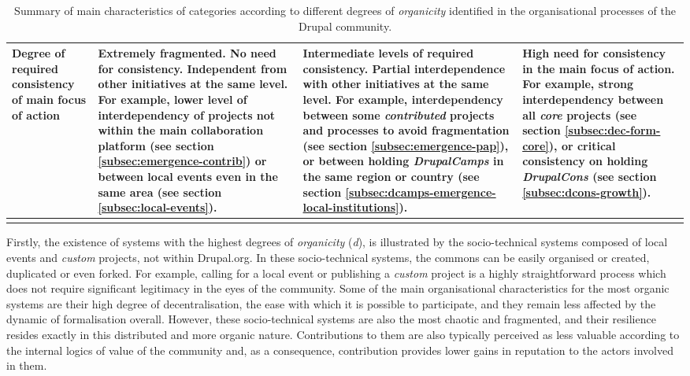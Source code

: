 \begin{footnotesize}
\begin{longtable}{|p{3cm}||p{3.4cm}|p{3.4cm}|p{3.4cm}|}
Degree of required consistency of main focus of action &
Extremely fragmented. No need for consistency. Independent from other initiatives at the same level. For example, lower level of interdependency of projects not within the main collaboration platform (see section \ref{subsec:emergence-contrib}) or between local events even in the same area (see section \ref{subsec:local-events}). &
Intermediate levels of required consistency. Partial interdependence with other initiatives at the same level. For example, interdependency between some \textit{contributed} projects and processes to avoid fragmentation (see section \ref{subsec:emergence-pap}), or between holding \textit{DrupalCamps} in the same region or country (see section \ref{subsec:dcamps-emergence-local-institutions}). &
High need for consistency in the main focus of action. For example, strong interdependency between all \textit{core} projects (see section \ref{subsec:dec-form-core}), or critical consistency on holding \textit{DrupalCons} (see section \ref{subsec:dcons-growth}). \\ \hline

\caption[Summary of main characteristics of categories according to different degrees of \textit{organicity} identified in the organisational processes of the Drupal community.]{Summary of main characteristics of categories according to different degrees of \textit{organicity} identified in the organisational processes of the Drupal community.}
\label{tab:layers-summary}
\end{longtable}
\end{footnotesize}

Firstly, the existence of systems with the highest degrees of \textit{organicity} (\textsl{d}), is illustrated by the socio-technical systems composed of local events and \textit{custom} projects, not within Drupal.org. In these socio-technical systems, the commons can be easily organised or created, duplicated or even forked. For example, calling for a local event or publishing a \textit{custom} project is a highly straightforward process which does not require significant legitimacy in the eyes of the community. Some of the main organisational characteristics for the most organic systems are their high degree of decentralisation, the ease with which it is possible to participate, and they remain less affected by the dynamic of formalisation overall. However, these socio-technical systems are also the most chaotic and fragmented, and their resilience resides exactly in this distributed and more organic nature. Contributions to them are also typically perceived as less valuable according to the internal logics of value of the community and, as a consequence, contribution provides lower gains in reputation to the actors involved in them.

